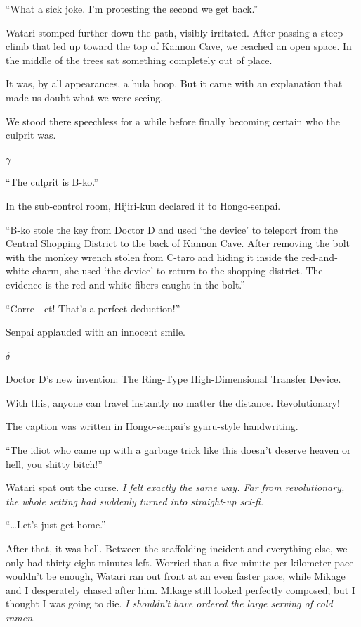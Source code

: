 \documentclass[
    a4paper,
    12pt,
    twoside,
    openany,
    UTF8,
    fontset=windows
]{ctexbook}
\begin{document}
``What a sick joke. I'm protesting the second we get back.''

Watari stomped further down the path, visibly irritated. After passing a steep climb that led up toward the top of Kannon Cave, we reached an open space. In the middle of the trees sat something completely out of place.

It was, by all appearances, a hula hoop. But it came with an explanation that made us doubt what we were seeing.

We stood there speechless for a while before finally becoming certain who the culprit was.

$\gamma$

``The culprit is B-ko.''

In the sub-control room, Hijiri-kun declared it to Hongo-senpai.

``B-ko stole the key from Doctor D and used `the device' to teleport from the Central Shopping District to the back of Kannon Cave. After removing the bolt with the monkey wrench stolen from C-taro and hiding it inside the red-and-white charm, she used `the device' to return to the shopping district. The evidence is the red and white fibers caught in the bolt.''

``Corre---ct! That's a perfect deduction!''

Senpai applauded with an innocent smile.

$\delta$

\begin{center}
Doctor D's new invention: The Ring-Type High-Dimensional Transfer Device.

With this, anyone can travel instantly no matter the distance. Revolutionary!
\end{center}

The caption was written in Hongo-senpai's gyaru-style handwriting.

``The idiot who came up with a garbage trick like this doesn't deserve heaven or hell, you shitty bitch!''

Watari spat out the curse. \textit{I felt exactly the same way. Far from revolutionary, the whole setting had suddenly turned into straight-up sci-fi.}

``\dots Let's just get home.''

After that, it was hell. Between the scaffolding incident and everything else, we only had thirty-eight minutes left. Worried that a five-minute-per-kilometer pace wouldn't be enough, Watari ran out front at an even faster pace, while Mikage and I desperately chased after him. Mikage still looked perfectly composed, but I thought I was going to die. \textit{I shouldn't have ordered the large serving of cold ramen.}
\end{document}
